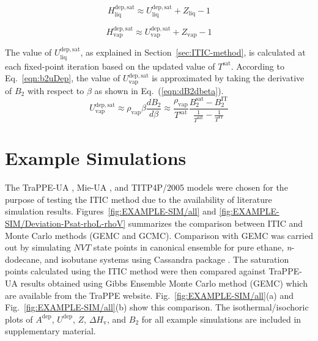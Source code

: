 \documentclass[5p,times]{elsarticle}
\begin{document}
\begin{equation}
H^{\mathrm{dep,sat}}_\mathrm{liq} \approx U^{\mathrm{dep, sat}}_\mathrm{liq}+Z_\mathrm{liq} - 1
\label{eqn:HsatLiq}
\end{equation}

\begin{equation}
H^{\mathrm{dep,sat}}_\mathrm{vap} \approx U^{\mathrm{dep, sat}}_\mathrm{vap}+Z_\mathrm{vap} - 1
\label{eqn:HsatVap}
\end{equation}

The value of $U^{\mathrm{dep, sat}}_\mathrm{liq}$, as explained in Section~\ref{sec:ITIC-method}, is calculated at each fixed-point iteration based on the updated value of $T^{\mathrm{sat}}$. According to Eq.~\ref{eqn:b2uDep}, the value of $U^{\mathrm{dep, sat}}_\mathrm{vap}$ is approximated by taking the derivative of $B_2$ with respect to $\beta$ as shown in Eq.~(\ref{eqn:dB2dbeta}).
\begin{equation}
U^{\mathrm{dep, sat}}_\mathrm{vap}\approx \rho_{\mathrm{vap}} \beta \frac{dB_2}{d\beta} \approx \frac{\rho_{\mathrm{vap}}}{T^{\mathrm{sat}}} \frac{B_2^{\mathrm{sat}}-B_2^{\mathrm{IT}}}{\frac{1}{T^{\mathrm{sat}}} - \frac{1}{T^{\mathrm{IT}}}}
\label{eqn:dB2dbeta}
\end{equation}

\section{Example Simulations} \label{sec:ExampleSim}
The TraPPE-UA \cite{Martin1998,Martin1999,Wick2000}, Mie-UA \cite{Potoff2009,Mick2017,Barhaghi2017,Mick2015}, and TITP4P/2005 \cite{Abascal2005} models were chosen for the purpose of testing the ITIC method due to the availability of literature simulation results. 
Figures~\ref{fig:EXAMPLE-SIM/all} and \ref{fig:EXAMPLE-SIM/Deviation-Psat-rhoL-rhoV} summarizes the comparison between ITIC and Monte Carlo methods (GEMC and GCMC). Comparison with GEMC was carried out by simulating $NVT$ state points in canonical ensemble for pure ethane, \textit{n}-dodecane, and isobutane systems using Cassandra package \cite{Shah2017}. The saturation points calculated using the ITIC method were then compared against TraPPE-UA results obtained using Gibbs Ensemble Monte Carlo method (GEMC) which are available from the TraPPE website\cite{eggimann2014}. Fig.~\ref{fig:EXAMPLE-SIM/all}(a) and Fig.~\ref{fig:EXAMPLE-SIM/all}(b) show this comparison. The isothermal/isochoric plots of $A^{\mathrm{dep}}$, $U^{\mathrm{dep}}$, $Z$, $\Delta H_{\mathrm{v}}$, and $B_2$ for all example simulations are included in supplementary material. 
\end{document}
